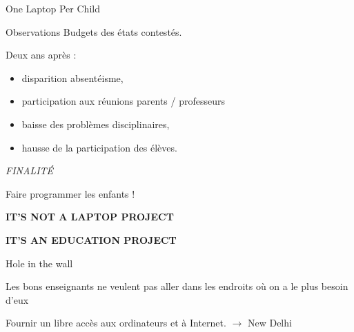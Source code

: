 \begin{frame}{One Laptop Per Child}
  \begin{block}{Observations}
    Budgets des états contestés.
    
    Deux ans après :
    \begin{itemize}
      \item disparition absentéisme,
      \item participation aux réunions parents / professeurs
      \item baisse des problèmes disciplinaires,
      \item hausse de la participation des élèves.
    \end{itemize}
  \end{block}
\pause
  \begin{center}
    \emph{\Huge FINALITÉ}
    
    Faire programmer les enfants !
    
    \vspace{.4cm}
  	\textbf{\LARGE IT'S NOT A LAPTOP PROJECT}
  	
    \vspace{.1cm}	
	\textbf{\LARGE IT'S AN EDUCATION PROJECT}
  \end{center}
\end{frame}

\begin{frame}
    \pause
    \begin{block}{Hole in the wall}
    \begin{coolquote}
    Les bons enseignants ne veulent pas aller dans les endroits où on a le plus besoin d'eux
    \end{coolquote}
    
      Fournir un libre accès aux ordinateurs et à Internet.
       $\rightarrow$ New Delhi
    \end{block}
\end{frame}

